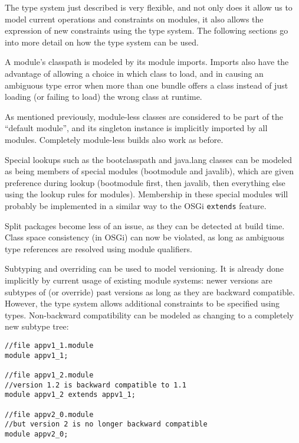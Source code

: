 The type system just described is very flexible, and not only does it
allow us to model current operations and constraints on modules, it also
allows the expression of new constraints using the type system. The following
sections go into more detail on how the type system can be used.


A module's classpath is modeled by its module imports. Imports also have the advantage
of allowing a choice in which class to load, and in causing an
ambiguous type error  when more than one bundle offers
a class instead of just loading (or failing to load) the wrong class at runtime.

As mentioned previously, module-less classes are considered to be part 
of the ``default module'', and its singleton instance is implicitly 
imported by all modules. Completely module-less builds also work as before.

Special lookups such as the bootclasspath and java.lang classes can be
modeled as being members of special modules (bootmodule and javalib), 
which are given preference during lookup (bootmodule first, then javalib,
then everything else using the lookup rules for modules). Membership
in these special modules will probably be implemented in a similar way to
the OSGi \texttt{extends} feature.

Split packages become less of an issue, as they can be detected at
build time. Class space consistency (in OSGi) can now be violated,
as long as ambiguous type references are resolved using module qualifiers.


Subtyping and overriding can be used to model versioning. It is already done
implicitly by current usage of existing module systems: newer versions are 
subtypes of (or override) past versions as long as they are backward compatible.
However, the type system allows additional constraints to be specified using
types. Non-backward compatibility can be modeled as changing to a
completely new subtype tree:

\begin{lstlisting}[caption=Versioning Using Subtyping]
//file appv1_1.module
module appv1_1;

//file appv1_2.module
//version 1.2 is backward compatible to 1.1
module appv1_2 extends appv1_1;

//file appv2_0.module
//but version 2 is no longer backward compatible
module appv2_0; 
\end{lstlisting}

